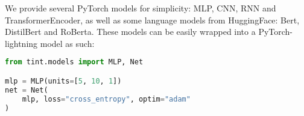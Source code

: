 We provide several PyTorch models for simplicity: MLP, CNN, RNN and TransformerEncoder, as well as some language models
from HuggingFace: Bert, DistilBert and RoBerta.
These models can be easily wrapped into a PyTorch-lightning model as such:

\begin{lstlisting}[language=Python, caption=Attribution loading example, label={lst:model}]
from tint.models import MLP, Net

mlp = MLP(units=[5, 10, 1])
net = Net(
    mlp, loss="cross_entropy", optim="adam"
)
\end{lstlisting}
